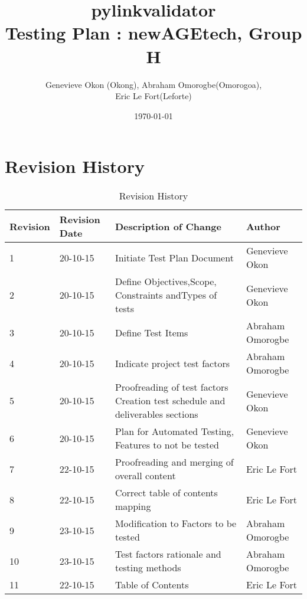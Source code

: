 \documentclass[12pt, titlepage]{article}
\begin{document}
\title{pylinkvalidator \\
 Testing Plan : newAGEtech, Group H }
\author{Genevieve Okon (Okong), Abraham Omorogbe(Omorogoa),\\
 Eric Le Fort(Leforte)}
\date{\today}
\maketitle
\pagebreak

\tableofcontents

\pagebreak
\listoffigures
\listoftables
\pagebreak


\section{Revision History}
\begin{table}[h!]
	\begin{tabular}{| p{5cm} | p{5cm} | p{5cm} |p{5cm} |}    \hline
Revision  &Revision Date &Description of Change &Author\\ \hline
1& 20-10-15& Initiate Test Plan Document&Genevieve Okon\\ \hline
2& 20-10-15& Define Objectives,Scope, Constraints andTypes of tests&Genevieve Okon\\ \hline
3& 20-10-15& Define Test Items&Abraham Omorogbe\\ \hline
4& 20-10-15& Indicate project test factors&Abraham Omorogbe\\ \hline
5& 20-10-15&Proofreading of test factors Creation test schedule and deliverables sections&Genevieve Okon\\ \hline
6& 20-10-15&Plan for Automated Testing, Features to not be tested&Genevieve Okon\\ \hline
7& 22-10-15& Proofreading and merging of overall content&Eric Le Fort\\ \hline
8& 22-10-15& Correct table of contents mapping&Eric Le Fort\\ \hline
9& 23-10-15& Modification to Factors to be tested&Abraham Omorogbe\\ \hline
10& 23-10-15& Test factors rationale and testing methods&Abraham Omorogbe\\ \hline
11& 22-10-15& Table of Contents&Eric Le Fort\\ \hline
       \end{tabular}
       
       \caption{Revision History}
       \label{table:Revision History}
\end{table}
\end{document}
